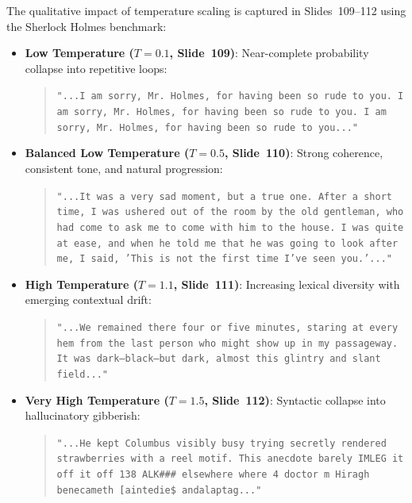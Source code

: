\documentclass[../../../main.tex]{subfiles}
\begin{document}
The qualitative impact of temperature scaling is captured in Slides~109--112 using the Sherlock Holmes benchmark:
\begin{itemize}
    \item \textbf{Low Temperature ($T = 0.1$, Slide~109)}: Near-complete probability collapse into repetitive loops:
    \begin{quote}
    \texttt{"...I am sorry, Mr. Holmes, for having been so rude to you. I am sorry, Mr. Holmes, for having been so rude to you. I am sorry, Mr. Holmes, for having been so rude to you..."}
    \end{quote}
    
    \item \textbf{Balanced Low Temperature ($T = 0.5$, Slide~110)}: Strong coherence, consistent tone, and natural progression:
    \begin{quote}
    \texttt{"...It was a very sad moment, but a true one. After a short time, I was ushered out of the room by the old gentleman, who had come to ask me to come with him to the house. I was quite at ease, and when he told me that he was going to look after me, I said, 'This is not the first time I've seen you.'..."}
    \end{quote}
    
    \item \textbf{High Temperature ($T = 1.1$, Slide~111)}: Increasing lexical diversity with emerging contextual drift:
    \begin{quote}
    \texttt{"...We remained there four or five minutes, staring at every hem from the last person who might show up in my passageway. It was dark---black---but dark, almost this glintry and slant field..."}
    \end{quote}
    
    \item \textbf{Very High Temperature ($T = 1.5$, Slide~112)}: Syntactic collapse into hallucinatory gibberish:
    \begin{quote}
    \texttt{"...He kept Columbus visibly busy trying secretly rendered strawberries with a reel motif. This anecdote barely IMLEG it off it off 138 ALK\#\#\# elsewhere where 4 doctor m Hiragh benecameth [aintedie\$ andalaptag..."}
    \end{quote}
\end{itemize}
\end{document}
